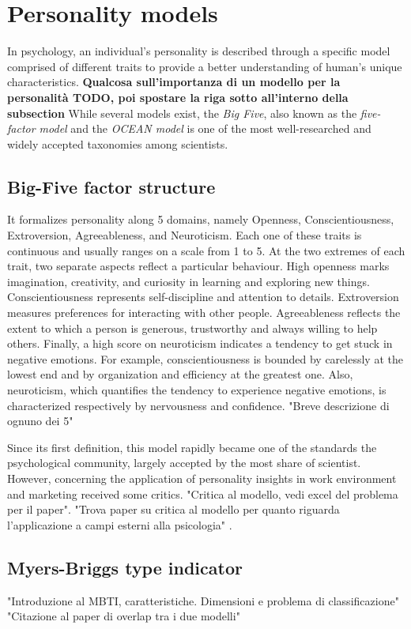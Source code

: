 \section{Personality models}
In psychology, an individual's personality is described through a specific model comprised of different traits to provide a better understanding of human's unique characteristics.
\textbf{Qualcosa sull'importanza di un modello per la personalità TODO, poi spostare la riga sotto all'interno della subsection}
While several models exist, the \textit{Big Five}, also known as the \textit{five-factor model} and the \textit{OCEAN model} is one of the most well-researched and widely accepted taxonomies among scientists.\cite{mccrae1992introduction, mccrae1987validation}
\subsection{Big-Five factor structure}
It formalizes personality along 5 domains, namely Openness, Conscientiousness, Extroversion, Agreeableness, and Neuroticism. Each one of these traits is continuous and usually ranges on a scale from 1 to 5.
At the two extremes of each trait, two separate aspects reflect a particular behaviour. 
High openness marks imagination, creativity, and curiosity in learning and exploring new things. Conscientiousness represents self-discipline and attention to details.
Extroversion measures preferences for interacting with other people. Agreeableness reflects the extent to which a person is generous, trustworthy and always willing to help others.
Finally, a high score on neuroticism indicates a tendency to get stuck in negative emotions.
For example, conscientiousness is bounded by carelessly at the lowest end and by organization and efficiency at the greatest one.
Also, neuroticism, which quantifies the tendency to experience negative emotions, is characterized respectively by nervousness and confidence.
"Breve descrizione di ognuno dei 5"

Since its first definition, this model rapidly became one of the standards the psychological community, largely accepted by the most share of scientist.
However, concerning the application of personality insights in work environment and marketing received some critics.
"Critica al modello, vedi excel del problema per il paper". "Trova paper su critica al modello per quanto riguarda l'applicazione a campi esterni alla psicologia" \cite{hough2003use, patton2014career}.

\subsection{Myers-Briggs type indicator}
"Introduzione al MBTI, caratteristiche. Dimensioni e problema di classificazione"
"Citazione al paper di overlap tra i due modelli"

